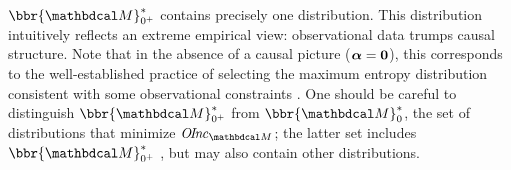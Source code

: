\documentclass{article}
\newcommand\obslimit{observational facet} %
\newcommand\voli[1]{{\color{olicolor}\textbf{$\boldsymbol\{$Oli: }#1 \textbf{$\boldsymbol\}$}}}
\begin{document}
$\bbr{\dg M}^*_{0^+}$ contains precisely one distribution.
This distribution intuitively
reflects an extreme empirical
view: observational data trumps causal structure.
Note that in the absence of a causal picture
($\boldsymbol\alpha = \mathbf{0}$), 
this
corresponds to the well-established 
practice of selecting
the maximum entropy distribution consistent with some observational constraints \parencite{jaynes1957information}.
%
One should be careful to distinguish 
$\bbr{\dg M}^*_{0^+}$
from $\bbr{\dg M}^*_0$,
the set of distributions that minimize
$\OInc_{\dg M}$; the latter  set
includes
 $\bbr{\dg M}^*_{0^+}$
\parencite[Prop 3.4]{pdg-aaai},
but may also contain other distributions.
\end{document}
